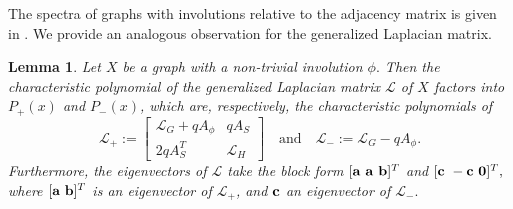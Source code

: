 \documentclass[12pt,a4paper]{article}
\newtheorem{lem}{Lemma}
\def \o {{\bf 0}}
\def \a {{\bf a}}
\def \b {{\bf b}}
\def \c {{\bf c}}
\begin{document}
The spectra of graphs with involutions relative to the adjacency matrix is given in \cite[Lemma 2]{kempton}. We provide an analogous observation for the generalized Laplacian matrix.

\begin{lem} \label{L1}
Let $X$ be a graph with a non-trivial involution $\phi.$ Then the characteristic polynomial of the generalized Laplacian matrix $\mathscr{L}$ of $X$ factors into $P_+(x)$ and $P_-(x)$, which are, respectively, the characteristic polynomials of $$\mathscr{L}_+:=\begin{bmatrix}
		\mathscr{L}_G+qA_\phi& qA_S\\
		2qA_S^T &\mathscr{L}_H
	\end{bmatrix}\quad \text{and}\quad \mathscr{L}_-:=\mathscr{L}_G-qA_\phi.$$
Furthermore, the eigenvectors of $\mathscr{L}$ take the block form $[\a~\a~\b]^T$ and $[\c~-\c~ \o]^T,$ where $[\a~ \b]^T$ is an eigenvector of $\mathscr{L}_+$, and $\c$ an eigenvector of $\mathscr{L}_-.$ 
 \end{lem}
\end{document}
